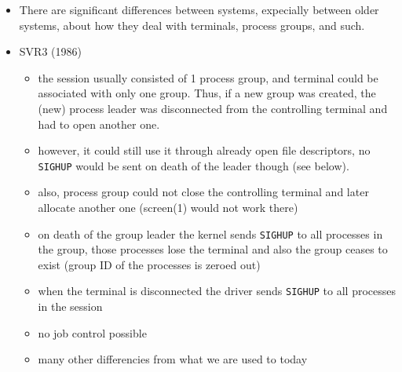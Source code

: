 \begin{itemize}
\item There are significant differences between systems, expecially between
older systems, about how they deal with terminals, process groups, and such.
\item SVR3 (1986)
\begin{itemize}
	\item the session usually consisted of 1 process group, and terminal
	could be associated with only one group. Thus, if a new group was
	created, the (new) process leader was disconnected from the controlling
	terminal and had to open another one.
	\item however, it could still use it through already open file
	descriptors, no \texttt{SIGHUP} would be sent on death of the leader
	though (see below).
	\item also, process group could not close the controlling terminal and
	later allocate another one (screen(1) would not work there)
	\item on death of the group leader the kernel sends \texttt{SIGHUP} to
	all processes in the group, those processes lose the terminal and also
	the group ceases to exist (group ID of the processes is zeroed out)
	\item when the terminal is disconnected the driver sends \texttt{SIGHUP}
	to all processes in the session
	\item no job control possible		  	
	\item many other differencies from what we are used to today
\end{itemize}


\end{itemize}
